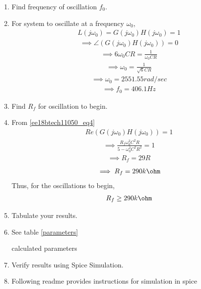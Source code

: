 \begin{enumerate}[label=\arabic*.,ref=\theenumi]
\item Find frequency of oscillation $f_0$.
\item \solution 
For system to oscillate at a frequency $\omega_0$, 
\begin{align}
    L(j\omega_0) = G(j\omega_0)H(j\omega_0) = 1
    \label{ee18btech11050_eq4}
\end{align}
\begin{align}
    \implies \angle(G(j\omega_0)H(j\omega_0)) = 0
\end{align}
\begin{align}
    \implies 6\omega_0 CR = \frac{1}{\omega_0 CR}
\end{align}
\begin{align}
    \implies \omega_0 = \frac{1}{\sqrt{6}CR}
\end{align}
\begin{align}
    \implies \omega_0 = 2551.55 rad/sec
\end{align}
\begin{align}
    \implies f_0 = 406.1 Hz
\end{align}
\item Find $R_f$ for oscillation to begin.
\item \solution From \eqref{ee18btech11050_eq4}
\begin{align}
    Re(G(j\omega_0)H(j\omega_0)) = 1
\end{align}
\begin{align}
    \implies \frac{R_f\omega_0^2C^2R}{5-\omega_0^2C^2R^2} = 1
\end{align}
\begin{align}
    \implies R_f = 29R
\end{align}
\begin{align}
    \implies R_f = 290 k\ohm
\end{align}
Thus, for the oscillations to begin,
\begin{align}
    R_f \geq 290 k\ohm
\end{align}
\item Tabulate your results.
\item \solution See table \ref{parameters}
\begin{table}[!ht]
\centering

\caption{calculated parameters}
\label{parameters}
\end{table}

\item Verify results using Spice Simulation.

\item \solution Following readme provides instructions for simulation in spice


\end{enumerate}
